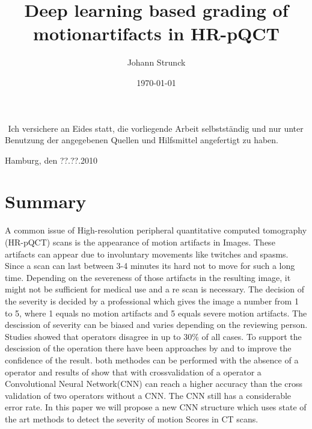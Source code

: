 \documentclass[
a4paper, 
12pt,
grayscalebody, %
abstract=on,
twoside, BCOR10mm, 12pt, DIV13,headinclude, footexclude, final, abstracton, openright
]{ibireprt}
\author{Johann Strunck}
\title{Deep learning based grading of motionartifacts in HR-pQCT}
\date{\today}
\numberwithin{equation}{chapter}
\numberwithin{table}{chapter}
\numberwithin{figure}{chapter}
\numberwithin{algorithm}{chapter}
\numberwithin{example}{chapter}
\numberwithin{example}{chapter}
\begin{document}
\maketitle


\newpage
${}^{}$
\vfill
\noindent
Ich versichere an Eides statt, die vorliegende Arbeit selbstständig und nur unter Benutzung der angegebenen Quellen und Hilfsmittel angefertigt zu haben.\\
\vspace{1.5cm}

\noindent
Hamburg, den ??.??.2010
\thispagestyle{empty}
\newpage
\newpage

\setlength{\parskip}{1.5mm }





\tableofcontents


\chapter*{Summary}
	A common issue of High-resolution peripheral quantitative computed tomography (HR-pQCT) scans is the appearance of motion artifacts in Images. These artifacts can appear due to involuntary movements like twitches and spasms. Since a scan can last between 3-4 minutes its hard not to move for such a long time. Depending on the severeness of those artifacts in the resulting image, it might not be sufficient for medical use and a re scan is necessary. The decision of the severity is decided by a professional which gives the image a number from 1 to 5, where 1 equals no motion artifacts and 5 equals severe motion artifacts. The descission of severity can be biased and varies depending on the reviewing person. Studies showed that operators disagree in up to 30\% of all cases.
	 To support the descission of the operation there have been approaches by \cite{Sode2011} and \cite{Walle2023}  to improve the confidence of the result. both methodes can be performed with the absence of a operator and results of \cite{Sode2011} show that with crossvalidation of a operator  a Convolutional Neural Network(CNN) can reach a higher accuracy than the cross validation of two operators without a CNN. The CNN still has a considerable error rate. In this paper we will propose a new CNN structure which uses state of the art methods to detect the severity of motion Scores in CT scans. 
\end{document}
